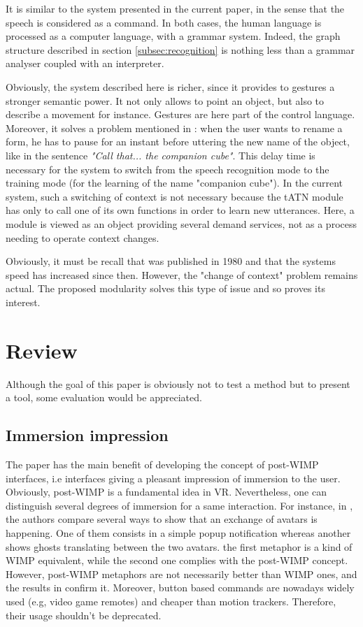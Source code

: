 \documentclass[a4paper]{article}
\begin{document}
It is similar to the system presented in the current paper, in the sense that the speech is considered as a command. In both cases, the human language is processed as a computer language, with a grammar system. Indeed, the graph structure described in section \ref{subsec:recognition} is nothing less than a grammar analyser coupled with an interpreter.

Obviously, the system described here is richer, since it provides to gestures a stronger semantic power. It not only allows to point an object, but also to describe a movement for instance. Gestures are here part of the control language. Moreover, it solves a problem mentioned in \cite{putthatthere}: when the user wants to rename a form, he has to pause for an instant before uttering the new name of the object, like in the sentence \textit{"Call that... the companion cube"}. This delay time is necessary for the system to switch from the speech recognition mode to the training mode (for the learning of the name "companion cube"). In the current system, such a switching of context is not necessary because the tATN module has only to call one of its own functions in order to learn new utterances. Here, a module is viewed as an object providing several demand services, not as a process needing to operate context changes.

Obviously, it must be recall that \cite{putthatthere} was published in 1980 and that the systems speed has increased since then. However, the "change of context" problem remains actual. The proposed modularity solves this type of issue and so proves its interest.

\section{Review}

Although the goal of this paper is obviously not to test a method but to present a tool, some evaluation would be appreciated.

\subsection{Immersion impression}
The paper has the main benefit of developing the concept of post-WIMP interfaces, i.e interfaces giving a pleasant impression of immersion to the user. Obviously, post-WIMP is a fundamental idea in VR. Nevertheless, one can distinguish several degrees of immersion for a same interaction. For instance, in \cite{avatars}, the authors compare several ways to show that an exchange of avatars is happening. One of them consists in a simple popup notification whereas another shows ghosts translating between the two avatars. the first metaphor is a kind of WIMP equivalent, while the second one complies with the post-WIMP concept. However, post-WIMP metaphors are not necessarily better than WIMP ones, and the results in \cite{avatars} confirm it. Moreover, button based commands are nowadays widely used (e.g, video game remotes) and cheaper than motion trackers. Therefore, their usage shouldn't be deprecated.
\end{document}
